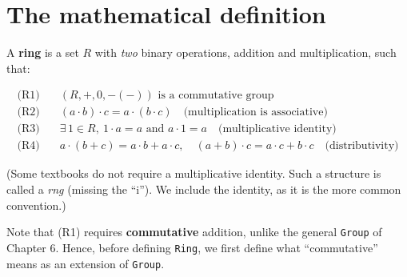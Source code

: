 \section{The mathematical definition}\label{sec:08-rings:01-definition:1}

A \textbf{ring} is a set \(R\) with \emph{two} binary operations, addition and multiplication, such that:

\[
\begin{aligned}
\text{(R1)}&\quad (R, +, 0, -(-)) \text{ is a commutative group} \\
\text{(R2)}&\quad (a \cdot b) \cdot c = a \cdot (b \cdot c) \quad \text{(multiplication is associative)} \\
\text{(R3)}&\quad \exists\, 1 \in R,\ 1 \cdot a = a \text{ and } a \cdot 1 = a \quad \text{(multiplicative identity)} \\
\text{(R4)}&\quad a \cdot (b + c) = a \cdot b + a \cdot c, \quad (a + b) \cdot c = a \cdot c + b \cdot c \quad \text{(distributivity)}
\end{aligned}
\]

(Some textbooks do not require a multiplicative identity. Such a structure is called a \emph{rng} (missing the ``i''). We include the identity, as it is the more common convention.)

Note that (R1) requires \textbf{commutative} addition, unlike the general \texttt{Group} of Chapter 6. Hence, before defining \texttt{Ring}, we first define what ``commutative'' means as an extension of \texttt{Group}.
